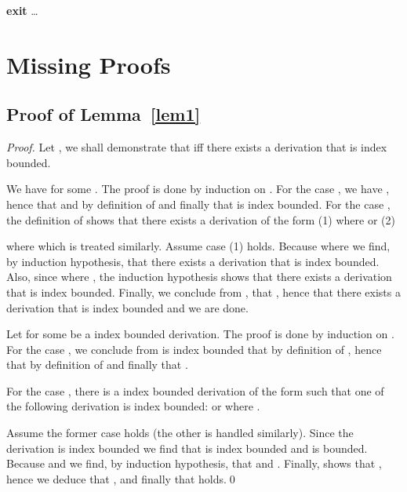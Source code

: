 \documentclass{fsttcs}
\begin{document}
\begin{algorithm}[H]
\nlset{}\goto \textbf{exit} \Kor  \Kor \ldots \Kor  \;
	\nlset{:} \;
	\;
	\goto \;
	[\ldots]\;
	\nlset{:}\;
	\;
	\goto \;
	 \Return{}\;
	\caption{\label{alg:trfromto}}
\end{algorithm}


\pagebreak
\section{Missing Proofs}

\subsection{Proof of Lemma~\ref{lem1}}
\begin{proof}
	Let , we shall demonstrate that
	 if{}f there exists a derivation 
	that is  index bounded.
	
We have  for some
. The proof is done by induction on .
For the case , we have , hence that  and  by definition of
 and finally that  is  index bounded.
For the case , the definition of  shows that there exists
a derivation of the form (1)  where  or (2)

where  which is treated similarly.  
Assume case (1) holds. Because  where 
we find, by induction hypothesis, that there exists a derivation  that is  index bounded. Also, since  where , 
the induction hypothesis shows that there exists a derivation  that is  index bounded.  Finally,
we conclude from  , that , hence
that there exists a derivation  that is  index bounded and we are done.

Let  for some
 be a  index bounded derivation. 
The proof is done by induction on .
For the case , we conclude from  is  index bounded that
 by definition of , hence that  by definition of  and finally that
.

For the case , there is a  index bounded derivation of the
form  such that one of the following
derivation is  index bounded:  or  where .

Assume the former case holds (the other is handled similarly).  Since the
derivation is  index bounded we find that  is
 index bounded and  is  bounded.  Because
 and  we find, by induction hypothesis, that  and .
Finally,  shows that , 
hence we deduce that , and finally that  holds.\qed
\end{proof}
\end{document}
